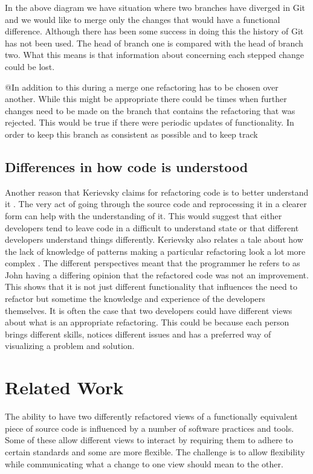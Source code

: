 \documentclass[12pt]{CRPITStyle}
\renewcommand{\cite}{\citep}
\begin{document}
In the above diagram we have situation where two branches have diverged in Git and we would like to merge only the changes that would have a functional difference. Although there has been some success in doing this the history of Git has not been used. The head of branch one is compared with the head of branch two. What this means is that information about concerning each stepped change could be lost. 

@In addition to this during a merge one refactoring has to be chosen over another. While this might be appropriate there could be times when further changes need to be made on the branch that contains the refactoring that was rejected. This would be true if there were periodic updates of functionality. In order to keep this branch as consistent as possible and to keep track
\subsection{Differences in how code is understood}
Another reason that Kerievsky claims for refactoring code is to better understand it \cite{Kerievsky2004}. The very act of going through the source code and reprocessing it in a clearer form can help with the understanding of it. This would suggest that either developers tend to leave code in a difficult to understand state or that different developers understand things differently.
Kerievsky also relates a tale about how the lack of knowledge of patterns making a particular refactoring look a lot more complex \cite{Kerievsky2004}. The different perspectives meant that the programmer he refers to as John having a differing opinion that the refactored code was not an improvement. This shows that it is not just different functionality that influences the need to refactor but sometime the knowledge and experience of the developers themselves. It is often the case that two developers could have different views about what is an appropriate refactoring. This could be because each person brings different skills, notices different issues and has a preferred way of visualizing a problem and solution.

\section{Related Work}
The ability to have two differently refactored views of a functionally equivalent piece of source code is influenced by a number of software practices and tools. Some of these allow different views to interact by requiring them to adhere to certain standards and some are more flexible. The challenge is to allow flexibility while communicating what a change to one view should mean to the other. 
\end{document}
